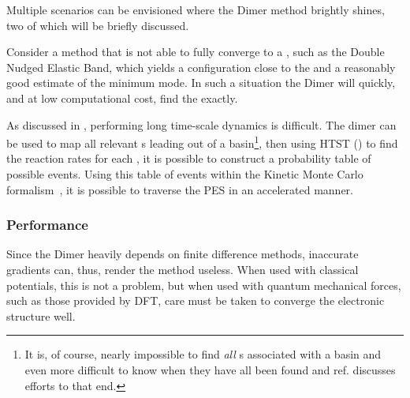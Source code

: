 Multiple scenarios can be envisioned where the Dimer method brightly shines, two of which will be briefly discussed.

\item Consider a method that is not able to fully converge to a , such as the Double Nudged Elastic Band, which yields a configuration close to the  and a reasonably good estimate of the minimum mode.
In such a situation the Dimer will quickly, and at low computational cost, find the  exactly.
~\cite{dneb-2004}
\item As discussed in , performing long time-scale dynamics is difficult.
The dimer can be used to map all relevant s leading out of a basin\footnote{It is, of course, nearly impossible to find \emph{all} s associated with a basin and even more difficult to know when they have all been found and ref. \cite{dimer-sampling-2011} discusses efforts to that end.}, then using HTST () to find the reaction rates for each , it is possible to construct a probability table of possible events.
Using this table of events within the Kinetic Monte Carlo formalism~\citemiss, it is possible to traverse the PES in an accelerated manner.
~\cite{akmc-2001}
\een

\subsubsection{Performance}
Since the Dimer heavily depends on finite difference methods, inaccurate gradients can, thus, render the method useless.
When used with classical potentials, this is not a problem, but when used with quantum mechanical forces, such as those provided by DFT, care must be taken to converge the electronic structure well.
